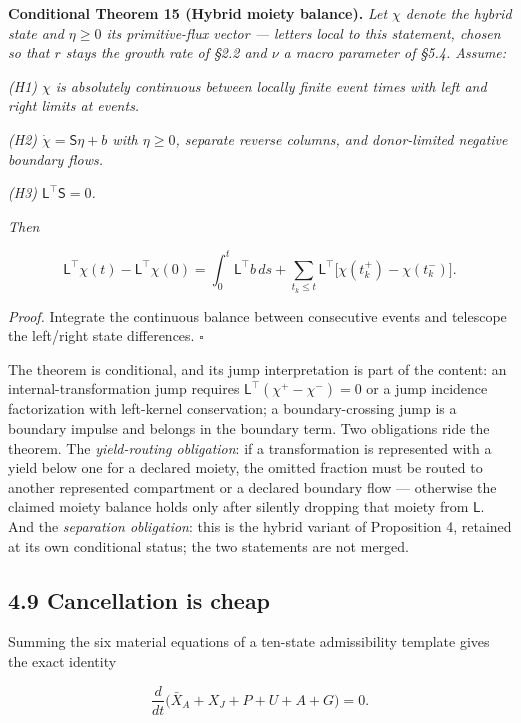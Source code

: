 \documentclass[11pt]{article}
\begin{document}
\textbf{Conditional Theorem 15 (Hybrid moiety balance).} \emph{Let \(\chi\) denote the hybrid state and \(\eta\ge0\) its primitive-flux vector --- letters local to this statement, chosen so that \(r\) stays the growth rate of \S2.2 and \(\nu\) a macro parameter of \S5.4. Assume:}

\emph{(H1) \(\chi\) is absolutely continuous between locally finite event times with left and right limits at events.}

\emph{(H2) \(\dot \chi =\allowbreak{} \mathsf{S}\eta +\allowbreak{} b\) with \(\eta \ge 0\), separate reverse columns, and donor-limited negative boundary flows.}

\emph{(H3) \(\mathsf{L}^\top \mathsf{S} =\allowbreak{} 0\).}

\emph{Then} 

$$\mathsf{L}^\top \chi(t) - \mathsf{L}^\top \chi(0) = \int_0^t \mathsf{L}^\top b\, ds + \sum_{t_k \le t} \mathsf{L}^\top \bigl[ \chi(t_k^+) - \chi(t_k^-) \bigr].$$



\emph{Proof.} Integrate the continuous balance between consecutive events and telescope the left/\allowbreak{}right state differences. \(\square\)

The theorem is conditional, and its jump interpretation is part of the content: an internal-transformation jump requires \(\mathsf{L}^\top(\chi^+\allowbreak{} - \chi^-) =\allowbreak{} 0\) or a jump incidence factorization with left-kernel conservation; a boundary-crossing jump is a boundary impulse and belongs in the boundary term. Two obligations ride the theorem. The \emph{yield-routing obligation}: if a transformation is represented with a yield below one for a declared moiety, the omitted fraction must be routed to another represented compartment or a declared boundary flow --- otherwise the claimed moiety balance holds only after silently dropping that moiety from \(\mathsf{L}\). And the \emph{separation obligation}: this is the hybrid variant of Proposition 4, retained at its own conditional status; the two statements are not merged.

\subsection*{4.9 Cancellation is cheap}\label{49-cancellation-is-cheap}

Summing the six material equations of a ten-state admissibility template gives the exact identity 

$$\frac{d}{dt}\bigl( \bar X_A + X_J + P + U + A + G \bigr) = 0.$$
\end{document}
